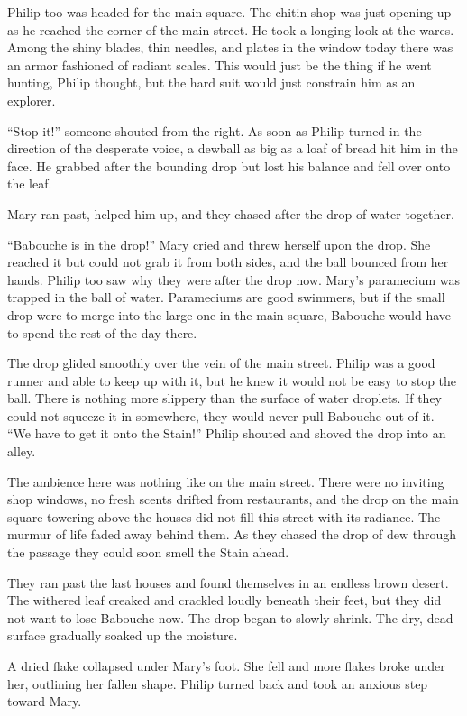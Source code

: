 \documentclass[10pt, draft]{memoir}
\begin{document}
Philip too was headed for the main square. The chitin shop was just opening up as he reached the corner of the main street. He took a longing look at the wares. Among the shiny blades, thin needles, and plates in the window today there was an armor fashioned of radiant scales. This would just be the thing if he went hunting, Philip thought, but the hard suit would just constrain him as an explorer.

``Stop it!'' someone shouted from the right. As soon as Philip turned in the direction of the desperate voice, a dewball as big as a loaf of bread hit him in the face. He grabbed after the bounding drop but lost his balance and fell over onto the leaf.

Mary ran past, helped him up, and they chased after the drop of water together.

``Babouche is in the drop!'' Mary cried and threw herself upon the drop. She reached it but could not grab it from both sides, and the ball bounced from her hands. Philip too saw why they were after the drop now. Mary's paramecium was trapped in the ball of water. Parameciums are good swimmers, but if the small drop were to merge into the large one in the main square, Babouche would have to spend the rest of the day there.

The drop glided smoothly over the vein of the main street. Philip was a good runner and able to keep up with it, but he knew it would not be easy to stop the ball. There is nothing more slippery than the surface of water droplets. If they could not squeeze it in somewhere, they would never pull Babouche out of it. ``We have to get it onto the Stain!'' Philip shouted and shoved the drop into an alley.

The ambience here was nothing like on the main street. There were no inviting shop windows, no fresh scents drifted from restaurants, and the drop on the main square towering above the houses did not fill this street with its radiance. The murmur of life faded away behind them. As they chased the drop of dew through the passage they could soon smell the Stain ahead.

They ran past the last houses and found themselves in an endless brown desert. The withered leaf creaked and crackled loudly beneath their feet, but they did not want to lose Babouche now. The drop began to slowly shrink. The dry, dead surface gradually soaked up the moisture.

A dried flake collapsed under Mary's foot. She fell and more flakes broke under her, outlining her fallen shape. Philip turned back and took an anxious step toward Mary.
\end{document}
